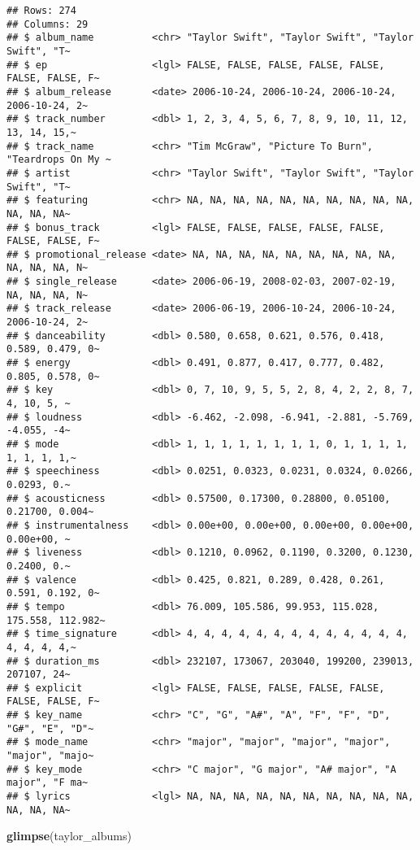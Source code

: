 \documentclass[
]{article}
\newenvironment{Shaded}{\begin{snugshade}}{\end{snugshade}}
\newcommand{\FunctionTok}[1]{\textcolor[rgb]{0.13,0.29,0.53}{\textbf{#1}}}
\newcommand{\NormalTok}[1]{#1}
\begin{document}
\begin{verbatim}
## Rows: 274
## Columns: 29
## $ album_name          <chr> "Taylor Swift", "Taylor Swift", "Taylor Swift", "T~
## $ ep                  <lgl> FALSE, FALSE, FALSE, FALSE, FALSE, FALSE, FALSE, F~
## $ album_release       <date> 2006-10-24, 2006-10-24, 2006-10-24, 2006-10-24, 2~
## $ track_number        <dbl> 1, 2, 3, 4, 5, 6, 7, 8, 9, 10, 11, 12, 13, 14, 15,~
## $ track_name          <chr> "Tim McGraw", "Picture To Burn", "Teardrops On My ~
## $ artist              <chr> "Taylor Swift", "Taylor Swift", "Taylor Swift", "T~
## $ featuring           <chr> NA, NA, NA, NA, NA, NA, NA, NA, NA, NA, NA, NA, NA~
## $ bonus_track         <lgl> FALSE, FALSE, FALSE, FALSE, FALSE, FALSE, FALSE, F~
## $ promotional_release <date> NA, NA, NA, NA, NA, NA, NA, NA, NA, NA, NA, NA, N~
## $ single_release      <date> 2006-06-19, 2008-02-03, 2007-02-19, NA, NA, NA, N~
## $ track_release       <date> 2006-06-19, 2006-10-24, 2006-10-24, 2006-10-24, 2~
## $ danceability        <dbl> 0.580, 0.658, 0.621, 0.576, 0.418, 0.589, 0.479, 0~
## $ energy              <dbl> 0.491, 0.877, 0.417, 0.777, 0.482, 0.805, 0.578, 0~
## $ key                 <dbl> 0, 7, 10, 9, 5, 5, 2, 8, 4, 2, 2, 8, 7, 4, 10, 5, ~
## $ loudness            <dbl> -6.462, -2.098, -6.941, -2.881, -5.769, -4.055, -4~
## $ mode                <dbl> 1, 1, 1, 1, 1, 1, 1, 1, 0, 1, 1, 1, 1, 1, 1, 1, 1,~
## $ speechiness         <dbl> 0.0251, 0.0323, 0.0231, 0.0324, 0.0266, 0.0293, 0.~
## $ acousticness        <dbl> 0.57500, 0.17300, 0.28800, 0.05100, 0.21700, 0.004~
## $ instrumentalness    <dbl> 0.00e+00, 0.00e+00, 0.00e+00, 0.00e+00, 0.00e+00, ~
## $ liveness            <dbl> 0.1210, 0.0962, 0.1190, 0.3200, 0.1230, 0.2400, 0.~
## $ valence             <dbl> 0.425, 0.821, 0.289, 0.428, 0.261, 0.591, 0.192, 0~
## $ tempo               <dbl> 76.009, 105.586, 99.953, 115.028, 175.558, 112.982~
## $ time_signature      <dbl> 4, 4, 4, 4, 4, 4, 4, 4, 4, 4, 4, 4, 4, 4, 4, 4, 4,~
## $ duration_ms         <dbl> 232107, 173067, 203040, 199200, 239013, 207107, 24~
## $ explicit            <lgl> FALSE, FALSE, FALSE, FALSE, FALSE, FALSE, FALSE, F~
## $ key_name            <chr> "C", "G", "A#", "A", "F", "F", "D", "G#", "E", "D"~
## $ mode_name           <chr> "major", "major", "major", "major", "major", "majo~
## $ key_mode            <chr> "C major", "G major", "A# major", "A major", "F ma~
## $ lyrics              <lgl> NA, NA, NA, NA, NA, NA, NA, NA, NA, NA, NA, NA, NA~
\end{verbatim}

\begin{Shaded}
\begin{Highlighting}[]
\FunctionTok{glimpse}\NormalTok{(taylor\_albums)}
\end{Highlighting}
\end{Shaded}
\end{document}
